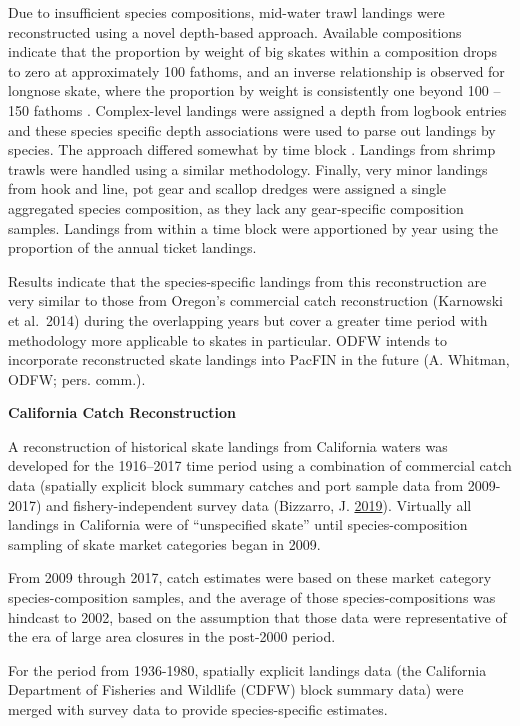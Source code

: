 \documentclass[12pt,]{article}
\begin{document}
Due to insufficient species compositions, mid-water trawl landings were
reconstructed using a novel depth-based approach. Available compositions
indicate that the proportion by weight of big skates within a
composition drops to zero at approximately 100 fathoms, and an inverse
relationship is observed for longnose skate, where the proportion by
weight is consistently one beyond 100 -- 150 fathoms . Complex-level
landings were assigned a depth from logbook entries and these species
specific depth associations were used to parse out landings by species.
The approach differed somewhat by time block . Landings from shrimp
trawls were handled using a similar methodology. Finally, very minor
landings from hook and line, pot gear and scallop dredges were assigned
a single aggregated species composition, as they lack any gear-specific
composition samples. Landings from within a time block were apportioned
by year using the proportion of the annual ticket landings.

Results indicate that the species-specific landings from this
reconstruction are very similar to those from Oregon's commercial catch
reconstruction (Karnowski et al.~2014) during the overlapping years but
cover a greater time period with methodology more applicable to skates
in particular. ODFW intends to incorporate reconstructed skate landings
into PacFIN in the future (A. Whitman, ODFW; pers. comm.).

\textbf{California Catch Reconstruction}

A reconstruction of historical skate landings from California waters was
developed for the 1916--2017 time period using a combination of
commercial catch data (spatially explicit block summary catches and port
sample data from 2009-2017) and fishery-independent survey data
(Bizzarro, J. \protect\hyperlink{ref-Bizzarro2019}{2019}). Virtually all
landings in California were of ``unspecified skate'' until
species-composition sampling of skate market categories began in 2009.

From 2009 through 2017, catch estimates were based on these market
category species-composition samples, and the average of those
species-compositions was hindcast to 2002, based on the assumption that
those data were representative of the era of large area closures in the
post-2000 period.

For the period from 1936-1980, spatially explicit landings data (the
California Department of Fisheries and Wildlife (CDFW) block summary
data) were merged with survey data to provide species-specific
estimates.
\end{document}
